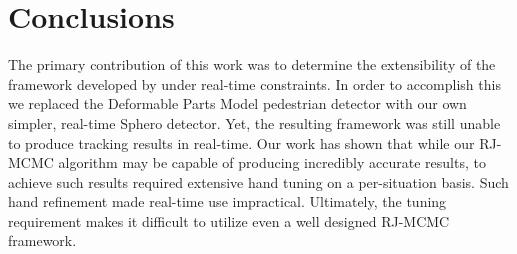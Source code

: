 \section{Conclusions}
\label{sec:conc}

The primary contribution of this work was to determine the extensibility of the framework developed by \cite{choi2010multiple}
under real-time constraints. In order to accomplish this we replaced the Deformable Parts Model pedestrian detector with our
own simpler, real-time Sphero detector. Yet, the resulting framework was still unable to produce tracking results in real-time. Our
work has shown that while our RJ-MCMC algorithm may be capable of producing incredibly accurate results, to achieve such
results required extensive hand tuning on a per-situation basis. Such hand refinement made real-time use impractical.
Ultimately, the tuning requirement makes it difficult to utilize even a well designed RJ-MCMC framework.